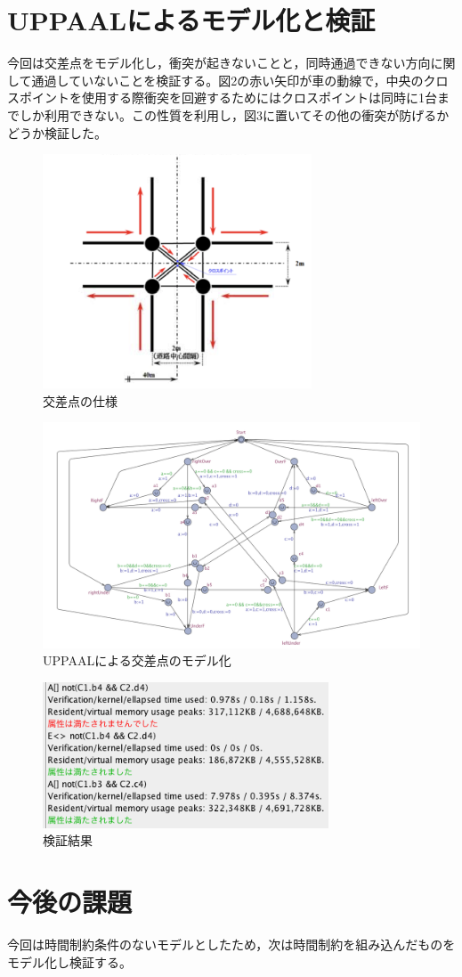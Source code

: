\documentclass[twocolumn]{jsarticle}
\begin{document}
\section*{UPPAALによるモデル化と検証}
今回は交差点をモデル化し，衝突が起きないことと，同時通過できない方向に関して通過していないことを検証する。図2の赤い矢印が車の動線で，中央のクロスポイントを使用する際衝突を回避するためにはクロスポイントは同時に1台までしか利用できない。この性質を利用し，図3に置いてその他の衝突が防げるかどうか検証した。
\begin{figure}
	\centering
	\includegraphics[width=80mm]{intermoderu.png}
	\caption{交差点の仕様}
\end{figure}
\begin{figure}
	\centering
	\includegraphics[width=170mm]{intersection.png}
	\caption{UPPAALによる交差点のモデル化}
\end{figure}
\begin{figure}
	\centering
	\includegraphics[width=85mm]{result.png}
	\caption{検証結果}
\end{figure}

\section*{今後の課題}
今回は時間制約条件のないモデルとしたため，次は時間制約を組み込んだものをモデル化し検証する。
\end{document}
